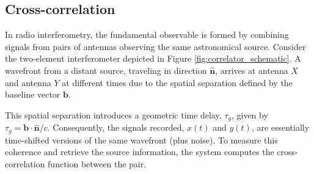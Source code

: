 \subsection{Cross-correlation}
\label{sec:cross_correlation}
In radio interferometry, the fundamental observable is formed by combining signals from pairs of antennas observing the same astronomical source. Consider the two-element interferometer depicted in Figure \ref{fig:correlator_schematic}. A wavefront from a distant source, traveling in direction $\widehat{\mathbf{n}}$, arrives at antenna $X$ and antenna $Y$ at different times due to the spatial separation defined by the baseline vector $\mathbf{b}$.

This spatial separation introduces a geometric time delay, $\tau_g$, given by $\tau_g = \mathbf{b} \cdot \widehat{\mathbf{n}} / c$. Consequently, the signals recorded, $x(t)$ and $y(t)$, are essentially time-shifted versions of the same wavefront (plus noise). To measure this coherence and retrieve the source information, the system computes the cross-correlation function between the pair.

